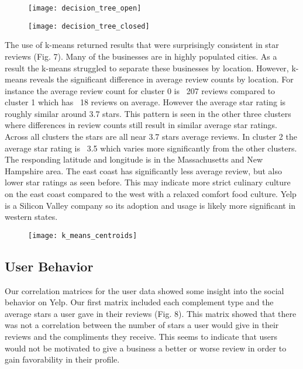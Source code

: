 \begin{figure}[h]
\texttt{[image: decision\_tree\_open]}
\end{figure}

\begin{figure}[h]
\texttt{[image: decision\_tree\_closed]}
\end{figure}

\quad The use of k-means returned results that were surprisingly consistent in star reviews (Fig. 7). Many of the businesses are in highly populated cities. As a result the k-means struggled to separate these businesses by location. However, k-means reveals the significant difference in average review counts by location. For instance the average review count for cluster 0 is ~207 reviews compared to cluster 1 which has ~18 reviews on average. However the average star rating is roughly similar around 3.7 stars. This pattern is seen in the other three clusters where differences in review counts still result in similar average star ratings. Across all clusters the stars are all near 3.7 stars average reviews. In cluster 2 the average star rating is ~3.5 which varies more significantly from the other clusters. The responding latitude and longitude is in the Massachusetts and New Hampshire area. The east coast has significantly less average review, but also lower star ratings as seen before. This may indicate more strict culinary culture on the east coast compared to the west with a relaxed comfort food culture. Yelp is a Silicon Valley company so its adoption and usage is likely more significant in western states.

\begin{figure}[h]
\texttt{[image: k\_means\_centroids]}
\end{figure}

\subsection{User Behavior}

\quad Our correlation matrices for the user data showed some insight into the social behavior on Yelp. Our first matrix included each complement type and the average stars a user gave in their reviews (Fig. 8). This matrix showed that there was not a correlation between the number of stars a user would give in their reviews and the compliments they receive. This seems to indicate that users would not be motivated to give a business a better or worse review in order to gain favorability in their profile.

